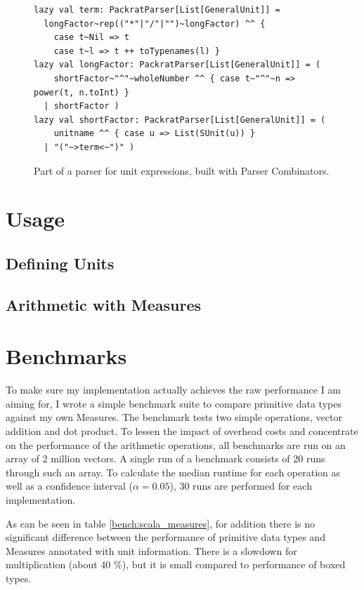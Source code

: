 \documentclass[12pt,oneside,a4paper]{scrbook}
\begin{document}
\begin{figure}
\begin{verbatim}
lazy val term: PackratParser[List[GeneralUnit]] =
  longFactor~rep(("*"|"/"|"")~longFactor) ^^ {
    case t~Nil => t
    case t~l => t ++ toTypenames(l) }
lazy val longFactor: PackratParser[List[GeneralUnit]] = (
    shortFactor~"^"~wholeNumber ^^ { case t~"^"~n => power(t, n.toInt) }
  | shortFactor )
lazy val shortFactor: PackratParser[List[GeneralUnit]] = (
    unitname ^^ { case u => List(SUnit(u)) }
  | "("~>term<~")" )
\end{verbatim}
\caption{Part of a parser for unit expressions, built with Parser Combinators.}
\label{code:scala_parse}
\end{figure}

\chapter{Usage}

\section{Defining Units}
\section{Arithmetic with Measures}

\chapter{Benchmarks}
\label{cha:bench}

To make sure my implementation actually achieves the raw performance I am aiming for, I wrote a simple benchmark suite to compare primitive data types against my own Measures. The benchmark tests two simple operations, vector addition and dot product. To lessen the impact of overhead costs and concentrate on the performance of the arithmetic operations, all benchmarks are run on an array of 2 million vectors. A single run of a benchmark consists of 20 runs through such an array. To calculate the median runtime for each operation as well as a confidence interval ($\alpha = 0.05$), 30 runs are performed for each implementation.

As can be seen in table \ref{bench:scala_measures}, for addition there is no significant difference between the performance of primitive data types and Measures annotated with unit information. There is a slowdown for multiplication (about 40 \%), but it is small compared to performance of boxed types.
\end{document}
